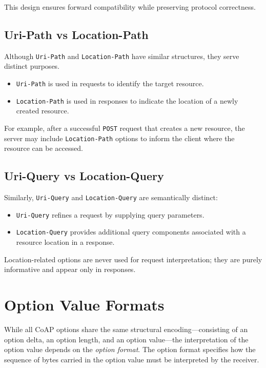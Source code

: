 \documentclass{scrbook}
\begin{document}
This design ensures forward compatibility while preserving protocol correctness.

\subsection{Uri-Path vs Location-Path}

Although \texttt{Uri-Path} and \texttt{Location-Path} have similar structures, they serve distinct purposes.

\begin{itemize}
    \item \texttt{Uri-Path} is used in requests to identify the target resource.
    \item \texttt{Location-Path} is used in responses to indicate the location of a newly created resource.
\end{itemize}

For example, after a successful \texttt{POST} request that creates a new resource, the server may include \texttt{Location-Path} options to inform the client where the resource can be accessed.

\subsection{Uri-Query vs Location-Query}

Similarly, \texttt{Uri-Query} and \texttt{Location-Query} are semantically distinct:

\begin{itemize}
    \item \texttt{Uri-Query} refines a request by supplying query parameters.
    \item \texttt{Location-Query} provides additional query components associated with a resource location in a response.
\end{itemize}

Location-related options are never used for request interpretation; they are purely informative and appear only in responses.

\section{Option Value Formats}

While all CoAP options share the same structural encoding—consisting of an option delta, an option length, and an option value—the interpretation of the option value depends on the \emph{option format}. The option format specifies how the sequence of bytes carried in the option value must be interpreted by the receiver.
\end{document}
